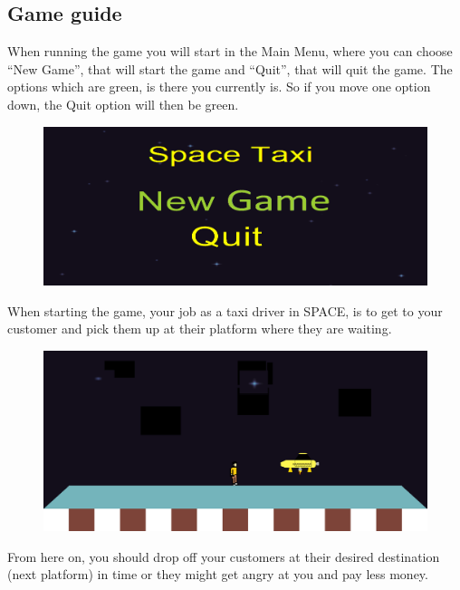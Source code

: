 \documentclass[../master.tex]{subfile}
\begin{document}
\subsection{Game guide}
When running the game you will start in the Main Menu, where you can choose ``New Game'', that will start the game and ``Quit'', that will quit the game. The options which are green, is there you currently is. So if you move one option down, the Quit option will then be green.
\begin{figure}[h]
	\includegraphics[width=1\textwidth]{./Pictures/MainMenu2.png}
\end{figure}

When starting the game, your job as a taxi driver in SPACE, is to get to your customer and pick them up at their platform where they are waiting. 
\begin{figure}[h]
	\includegraphics[width=1\textwidth]{./Pictures/SpaceTaxiLandingNew3.png}
\end{figure}

From here on, you should drop off your customers at their desired destination (next platform) in time or they might get angry at you and pay less money.\\

\newpage
\end{document}
